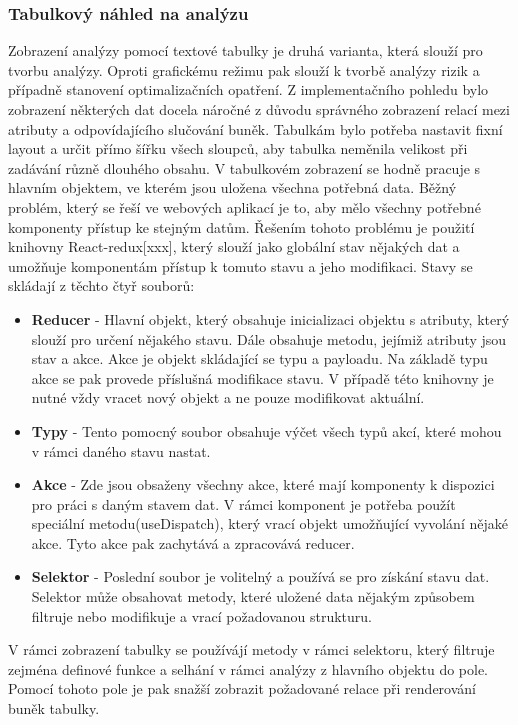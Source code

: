 \subsubsection{Tabulkový náhled na analýzu}
Zobrazení analýzy pomocí textové tabulky je druhá varianta, která slouží pro tvorbu analýzy. Oproti grafickému režimu pak slouží k tvorbě analýzy rizik a případně stanovení optimalizačních opatření. Z implementačního pohledu bylo zobrazení některých dat docela náročné z důvodu správného zobrazení relací mezi atributy a odpovídajícího slučování buněk. Tabulkám bylo potřeba nastavit fixní layout a určit přímo šířku všech sloupců, aby tabulka neměnila velikost při zadávání různě dlouhého obsahu. V tabulkovém zobrazení se hodně pracuje s hlavním objektem, ve kterém jsou uložena všechna potřebná data. Běžný problém, který se řeší ve webových aplikací je to, aby mělo všechny potřebné komponenty přístup ke stejným datům. Řešením tohoto problému je použití knihovny React-redux[xxx], který slouží jako globální stav nějakých dat a umožňuje komponentám přístup k tomuto stavu a jeho modifikaci. Stavy se skládají z těchto čtyř souborů: 
\begin{itemize}
    \item \textbf{Reducer} - Hlavní objekt, který obsahuje inicializaci objektu s atributy, který slouží pro určení nějakého stavu. Dále obsahuje metodu, jejímiž atributy jsou stav a akce. Akce je objekt skládající se typu a payloadu. Na základě typu akce se pak provede příslušná modifikace stavu. V případě této knihovny je nutné vždy vracet nový objekt a ne pouze modifikovat aktuální. 
    \item \textbf{Typy} - Tento pomocný soubor obsahuje výčet všech typů akcí, které mohou v rámci daného stavu nastat. 
 \item \textbf{Akce} - Zde jsou obsaženy všechny akce, které mají komponenty k dispozici pro práci s daným stavem dat. V rámci komponent je potřeba použít speciální metodu(useDispatch), který vrací objekt umožňující vyvolání nějaké akce. Tyto akce pak zachytává a zpracovává reducer. 
 \item \textbf{Selektor} - Poslední soubor je volitelný a používá se pro získání stavu dat. Selektor může obsahovat metody, které uložené data nějakým způsobem filtruje nebo modifikuje a vrací požadovanou strukturu. 
\end{itemize}
V rámci zobrazení tabulky se používájí metody v rámci selektoru, který filtruje zejména definové funkce a selhání v rámci analýzy z hlavního objektu do pole. Pomocí tohoto pole je pak snažší zobrazit požadované relace při renderování buněk tabulky. 

